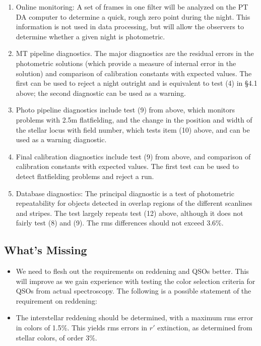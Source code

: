 \begin{enumerate}
   \item Online monitoring:  A set of frames in one filter will
	be analyzed on the PT DA computer to determine a quick,
	rough zero point during the night.  This information is
	not used in data processing, but will allow the observers to
determine whether a given night is photometric. 
   \item MT pipeline diagnostics.  The major diagnostics are the
	residual errors in the photometric solutions (which provide
	a measure of internal error in the solution) and comparison
	of calibration constants with expected values.  The first
	can be used to reject a night outright and
	is equivalent to test (4) in \S 4.1 above; the second
	diagnostic can be used as a warning.	
   \item Photo pipeline diagnostics include test (9) from above, which
	monitors problems with 2.5m flatfielding, and the change in
the position and width of the stellar locus with field number, which
tests item (10) above, and can be used as a warning diagnostic.
   \item Final calibration diagnostics include test (9) from above,
	and comparison of calibration constants with expected values.
	The first test can be used to detect flatfielding problems
	and reject a run.
   \item Database diagnostics: The principal diagnostic is a
	test of photometric repeatability for objects detected in overlap
	regions of the different scanlines and stripes.  The test largely
	repeats test (12) above, although it does not fairly
	test (8) and (9).  The rms differences should not exceed 3.6\%.
\end{enumerate}

\subsection{What's Missing}
\begin{itemize} 

\item We need to flesh out the requirements on reddening and QSOs
better.  This will improve as we gain experience with testing the
color selection criteria for QSOs from actual spectroscopy.  The
following is a possible statement of the requirement on reddening:

\item The interstellar reddening should be determined, with a maximum rms
error in colors of 1.5\%.  This yields rms errors in $r'$ extinction,
as determined from stellar colors, of order 3\%. 

\end{itemize}



